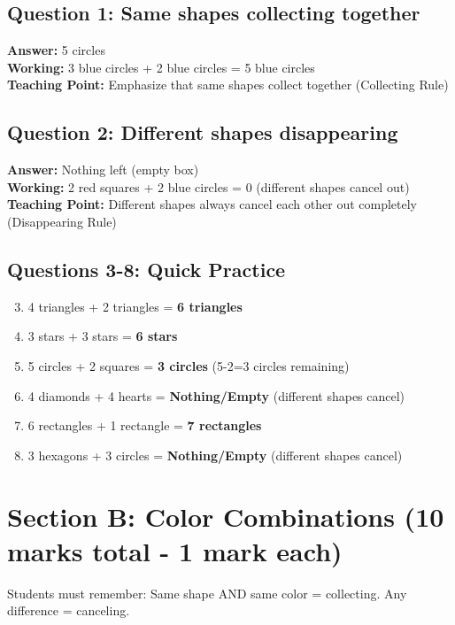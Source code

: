 \documentclass{article}
\begin{document}
\subsection*{Question 1: Same shapes collecting together}
\textbf{Answer:} 5 circles \\
\textbf{Working:} 3 blue circles + 2 blue circles = 5 blue circles \\
\textbf{Teaching Point:} Emphasize that same shapes collect together (Collecting Rule)

\subsection*{Question 2: Different shapes disappearing}
\textbf{Answer:} Nothing left (empty box) \\
\textbf{Working:} 2 red squares + 2 blue circles = 0 (different shapes cancel out) \\
\textbf{Teaching Point:} Different shapes always cancel each other out completely (Disappearing Rule)

\subsection*{Questions 3-8: Quick Practice}
\begin{enumerate}
    \setcounter{enumi}{2}
    \item 4 triangles + 2 triangles = \textbf{6 triangles}
    \item 3 stars + 3 stars = \textbf{6 stars}
    \item 5 circles + 2 squares = \textbf{3 circles} (5-2=3 circles remaining)
    \item 4 diamonds + 4 hearts = \textbf{Nothing/Empty} (different shapes cancel)
    \item 6 rectangles + 1 rectangle = \textbf{7 rectangles}
    \item 3 hexagons + 3 circles = \textbf{Nothing/Empty} (different shapes cancel)
\end{enumerate}

\section{Section B: Color Combinations (10 marks total - 1 mark each)}

\begin{tcolorbox}[colback=blue!5,colframe=blue!40,title=Teaching Reminder]
Students must remember: Same shape AND same color = collecting. Any difference = canceling.
\end{tcolorbox}
\end{document}
